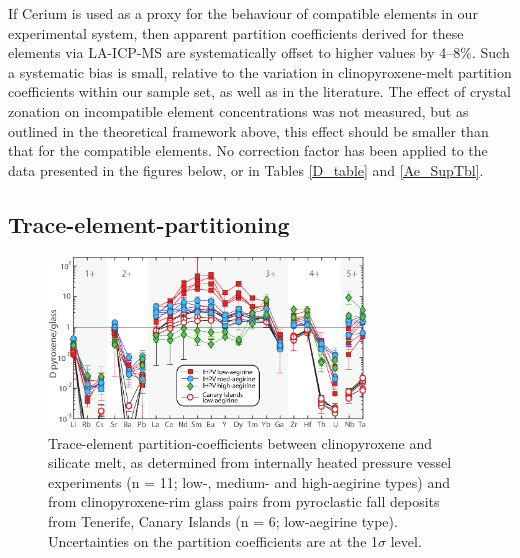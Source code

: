 \documentclass[review,authoryear,12pt]{elsarticle}
\begin{document}
If Cerium is used as a proxy for the behaviour of compatible elements in our experimental system, then apparent partition coefficients derived for these elements via LA-ICP-MS are systematically offset to higher values by 4--8\%. Such a systematic bias is small, relative to the variation in clinopyroxene-melt partition coefficients within our sample set, as well as in the literature. The effect of crystal zonation on incompatible element concentrations was not measured, but as outlined in the theoretical framework above, this effect should be smaller than that for the compatible elements. No correction factor has been applied to the data presented in the figures below, or in Tables \ref{D_table} and \ref{Ae_SupTbl}. 

\subsection{Trace-element-partitioning}

        \begin{figure}[tb]
        \begin{center}
        \includegraphics[width=0.75\textwidth]{6_Px_D_Spider_Apr2018.eps}
        \caption[Extended trace-element-partitioning diagram for clinopyroxene/melt]{Trace-element partition-coefficients between clinopyroxene and silicate melt, as determined from internally heated pressure vessel experiments (n = 11; low-, medium- and high-aegirine types) and from clinopyroxene-rim glass pairs from pyroclastic fall deposits from Tenerife, Canary Islands (n = 6; low-aegirine type). Uncertainties on the partition coefficients are at the 1$\sigma$ level.}
        \label{6_D_Spider}
        \end{center}
        \end{figure}
\end{document}
